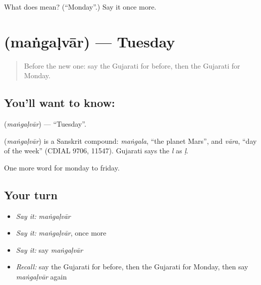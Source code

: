 \begin{tcolorbox}[breakable,colback=teal!4,colframe=teal!35!black,title={Before you move on}]
What does  mean? (\textquotedblleft{}Monday\textquotedblright{}.) Say it once more.
\end{tcolorbox}
\section[\texorpdfstring{\gu{મંગળવાર} (maṅgaḷvār)}{મંગળવાર (maṅgaḷvār)}]{ (maṅgaḷvār) — Tuesday}

\label{lesson:GU-C78-tuesday}



\begin{quote}
Before the new one: say the Gujarati for before, then the Gujarati for Monday.
\end{quote}

\subsection*{You'll want to know: }
\textbf{} (\emph{maṅgaḷvār}) — \textquotedblleft{}Tuesday\textquotedblright{}.

\begin{cousinweb}
\textbf{} (\emph{maṅgaḷvār}) is a Sanskrit compound: \emph{maṅgala}, \textquotedblleft{}the planet Mars\textquotedblright{}, and \emph{vāra}, \textquotedblleft{}day of the week\textquotedblright{} (CDIAL 9706, 11547). Gujarati says the \emph{l} as \emph{ḷ}.
\end{cousinweb}

\begin{grammarlens}[title={What you've built}]
One more word for monday to friday.
\end{grammarlens}

\subsection*{Your turn}
\begin{itemize}
\raggedright
  \item \emph{Say it:} \emph{maṅgaḷvār}
  \item \emph{Say it:} \emph{maṅgaḷvār}, once more
  \item \emph{Say it:} say \emph{maṅgaḷvār}
  \item \emph{Recall:} say the Gujarati for before, then the Gujarati for Monday, then say \emph{maṅgaḷvār} again
\end{itemize}

